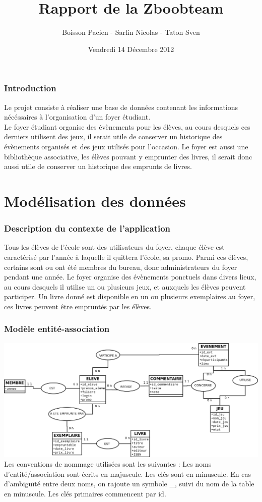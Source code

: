 \documentclass[a4paper, 11pt]{article}
\title{Rapport de la Zboobteam}
\author{Boisson Pacien - Sarlin Nicolas - Taton Sven}
\date{Vendredi 14 Décembre 2012}
\begin{document}
\maketitle
\tableofcontents
\newpage
\section{Introduction}
Le projet consiste à réaliser une base de données contenant les informations nécéssaires à l'organisation d'un foyer étudiant.\\
Le foyer étudiant organise des évènements pour les élèves, au cours desquels ces derniers utilisent des jeux, il serait utile de conserver un historique des évènements organisés et des jeux utilisés pour l'occasion. Le foyer est aussi une bibliothèque associative, les élèves pouvant y emprunter des livres, il serait donc aussi utile de conserver un historique des emprunts de livres.
\newpage
\part{Modélisation des données}
\setcounter{section}{0}
\section{Description du contexte de l'application}
Tous les élèves de l'école sont des utilisateurs du foyer, chaque élève est caractérisé par l'année à laquelle il quittera l'école, sa promo. Parmi ces élèves, certains sont ou ont été membres du bureau, donc administrateurs du foyer pendant une année. Le foyer organise des évènements ponctuels dans divers lieux, au cours desquels il utilise un ou plusieurs jeux, et auxquels les élèves peuvent participer. Un livre donné est disponible en un ou plusieurs exemplaires au foyer, ces livres peuvent être empruntés par les élèves.
\section{Modèle entité-association}
\includegraphics[width=1.2\textwidth]{ER.png}
Les conventions de nommage utilisées sont les suivantes : Les noms d'entité/association sont écrits en majuscule. Les clés sont en minuscule. En cas d'ambigu\"ité entre deux noms, on rajoute un symbole \_, suivi du nom de la table en minuscule. Les clés primaires commencent par id.
\end{document}
